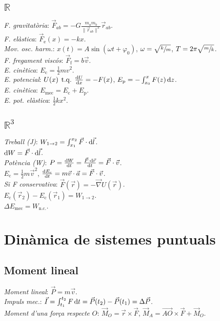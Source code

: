 \documentclass[10pt]{article}
\newcommand{\real}{\mathbb{R}}
\newcommand{\ci}{\textbullet\;}
\DeclareMathOperator{\tq}{\;t.q.\;}
\begin{document}
\begin{multicols}{3}
\subsection{$\real$}
\emph{F. gravitat\`oria}: $\vec{F}_{ab} = -G \frac{m_a m_b}{\|\vec{r}_{ab}\|^3} \vec{r}_{ab}$. \\
\emph{F. el\`astica}: $\vec{F}_{\text{e}}(x) = -kx$. \\
\emph{Mov. osc. harm.}: $x(t) = A\sin (\omega t + \varphi_0)$, $\omega = \sqrt{\sfrac{k}{m}}$, $T = 2\pi\sqrt{\sfrac{m}{k}}$. \\
\emph{F. fregament visc\'os}: $\vec{F}_{\text{f}} = b\vec{v}$. \\
\emph{E. cin\`etica}: $E_{\text{c}} = \frac{1}{2}mv^2$. \\
\emph{E. potencial}: $U(x) \tq \frac{\dif U}{\dif x} = -F(x)$, $E_{\text{p}} = -\int_{x_0}^x F(z) \dif z$. \\
\emph{E. cin\`etica}: $E_{\text{mec}} = E_{\text{c}} + E_{\text{p}}$. \\
\emph{E. pot. el\`astica}: $\frac{1}{2}kx^2$.

\subsection{$\real^3$}
\emph{Treball (J)}: $W_{1\rightarrow 2} = \int_{x_1}^{x_2} \vec{F} \cdot\dif \vec{l}$. \\
\ci $\dif W = \vec{F} \cdot\dif \vec{l}$. \\
\emph{Pot\`encia (W)}: $P = \frac{\dif W}{\dif t} = \frac{\vec{F} \cdot\dif \vec{r}}{\dif t} = \vec{F}\cdot\vec{v}$. \\
\ci $E_{\text{c}} = \frac{1}{2}m\vec{v}^2$, $\frac{\dif E_{\text{c}}}{\dif t} = m\vec{v}\cdot\vec{a} = \vec{F}\cdot\vec{v}$. \\
\emph{Si F conservativa}: $\vec{F}(\vec{r}) = -\vec{\nabla}U(\vec{r})$. \\
\ci $E_{\text{c}}(\vec{r}_2) - E_{\text{c}}(\vec{r}_1) = W_{1\rightarrow 2}$. \\
\ci $\Delta E_{\text{mec}} = W_{\text{n.c.}}$.

\section{Din\`amica de sistemes puntuals}

\subsection{Moment lineal}
\emph{Moment lineal}: $\vec{P} = m\vec{v}$. \\
\emph{Impuls mec.}: $\vec{I} = \int_{t_1}^{t_2} F \dif t = \vec{P}(t_2) - \vec{P}(t_1) = \Delta\vec{P}$. \\
\emph{Moment d'una força respecte $O$}: $\vec{M}_O = \vec{r}\times\vec{F}$, $\vec{M}_A = \vec{AO}\times\vec{F} + \vec{M}_O$.


\end{multicols}
\end{document}

